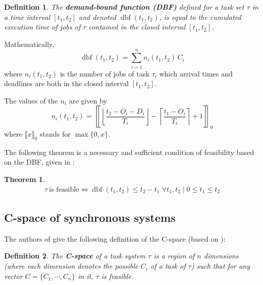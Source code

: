\documentclass[conference]{IEEEtran}
\newtheorem{theorem}{Theorem}
\newtheorem{definition}{Definition}
\newcommand{\dbf}[1]{\operatorname{dbf}(#1)}
\begin{document}
		\begin{definition}
			The \textbf{demand-bound function (DBF)}
			defined for a task set $\tau$ in a time interval $[t_1, t_2]$ and denoted $\dbf{t_1, t_2}$, is
			equal to the cumulated execution time of jobs of $\tau$ contained in the
			closed interval $[t_1, t_2]$.
		\end{definition}

		Mathematically,
		\begin{equation}
			\dbf{t_1, t_2} = \sum_{i=1}^{n} n_i(t_1, t_2) \, C_i
		\end{equation}
		where $n_i(t_1, t_2)$ is the number of jobs of task $\tau_i$ which arrival times
		and deadlines are both in the closed interval $[t_1, t_2]$.

		The values of the $n_i$ are given by \cite{baruah1990algorithms}
		\begin{equation}
			n_i(t_1, t_2) =
			\left\llbracket
				\left\lfloor
					\frac{t_2 - O_i - D_i}{T_i}
				\right\rfloor -
				\left\lceil
					\frac{t_1 - O_i}{T_i}
				\right\rceil + 1
			\right\rrbracket_0
		\end{equation}
		where $\llbracket x \rrbracket_0$ stands for $\max \{ 0, x \}$.

		The following theorem is a necessary and sufficient condition of feasibility
		based on the DBF, given in \cite{baruah1999generalized}:
		\begin{theorem}
			\begin{equation*}
				\begin{array}{c}
					\tau \: \text{is feasible}  \iff
					\dbf{t_1, t_2} \leqslant t_2 - t_1 \; \forall t_1, t_2 \mid  0 \leq t_1 \leq t_2
				\end{array}
			\end{equation*}
		\end{theorem}

	\subsection{C-space of synchronous systems}
	\label{sct:cspaceDescr}

			The authors of \cite{george2009characterization} give the following definition of the C-space (based on \cite{bini2004schedulability}):
			\begin{definition}
				The \textbf{C-space} of a task system $\tau$ is a region of $n$ dimensions (where each dimension denotes the possible $C_i$ of a task of $\tau$) such that for any vector $C = \{ C_1, \cdots, C_{n}\}$ in it, $\tau$ is feasible.
			\end{definition}
\end{document}
